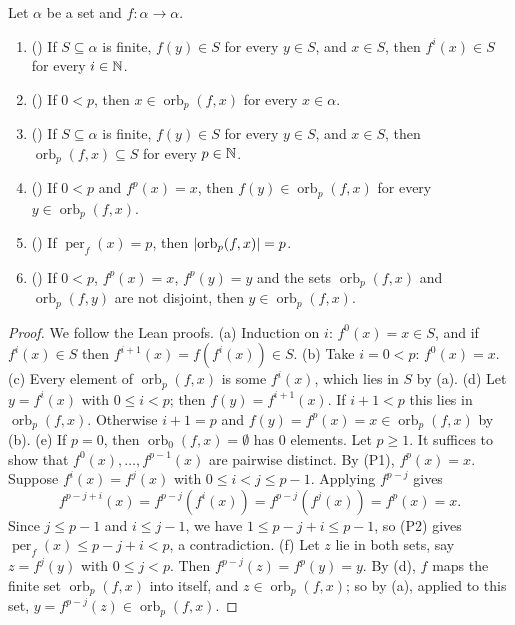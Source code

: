 \begin{lemma}\label{ll:lem:orbit}
Let $\alpha$ be a set and $f:\alpha\to\alpha$.
\begin{enumerate}[label=(\alph*)]
\item () If $S\subseteq\alpha$ is finite, $f(y)\in S$ for every $y\in S$, and $x\in S$, then
  $f^i(x)\in S$ for every $i\in\mathbb N$.
\item () If $0<p$, then $x\in\operatorname{orb}_p(f,x)$ for every $x\in\alpha$.
\item () If $S\subseteq\alpha$ is finite, $f(y)\in S$ for every $y\in S$, and $x\in S$, then
  $\operatorname{orb}_p(f,x)\subseteq S$ for every $p\in\mathbb N$.
\item () If $0<p$ and $f^p(x)=x$, then $f(y)\in\operatorname{orb}_p(f,x)$ for every
  $y\in\operatorname{orb}_p(f,x)$.
\item () If $\operatorname{per}_f(x)=p$, then
  $\lvert\operatorname{orb}_p(f,x)\rvert=p$.
\item () If $0<p$, $f^p(x)=x$, $f^p(y)=y$ and the sets $\operatorname{orb}_p(f,x)$
  and $\operatorname{orb}_p(f,y)$ are not disjoint, then $y\in\operatorname{orb}_p(f,x)$.
\end{enumerate}
\end{lemma}

\begin{proof}
We follow the Lean proofs.
(a) Induction on $i$: $f^0(x)=x\in S$, and if $f^i(x)\in S$ then $f^{i+1}(x)=f(f^i(x))\in S$.
(b) Take $i=0<p$: $f^0(x)=x$.
(c) Every element of $\operatorname{orb}_p(f,x)$ is some $f^i(x)$, which lies in $S$ by (a).
(d) Let $y=f^i(x)$ with $0\le i<p$; then $f(y)=f^{i+1}(x)$. If $i+1<p$ this lies in $\operatorname{orb}_p(f,x)$.
Otherwise $i+1=p$ and $f(y)=f^p(x)=x\in\operatorname{orb}_p(f,x)$ by (b).
(e) If $p=0$, then $\operatorname{orb}_0(f,x)=\emptyset$ has $0$ elements. Let $p\ge1$. It suffices to show that
$f^0(x),\dots,f^{p-1}(x)$ are pairwise distinct. By (P1), $f^p(x)=x$. Suppose $f^i(x)=f^j(x)$ with $0\le i<j\le p-1$.
Applying $f^{p-j}$ gives
\[f^{p-j+i}(x)=f^{p-j}(f^i(x))=f^{p-j}(f^j(x))=f^p(x)=x .\]
Since $j\le p-1$ and $i\le j-1$, we have $1\le p-j+i\le p-1$, so (P2) gives $\operatorname{per}_f(x)\le p-j+i<p$, a
contradiction.
(f) Let $z$ lie in both sets, say $z=f^j(y)$ with $0\le j<p$. Then $f^{p-j}(z)=f^{p}(y)=y$. By (d), $f$ maps the finite
set $\operatorname{orb}_p(f,x)$ into itself, and $z\in\operatorname{orb}_p(f,x)$; so by (a), applied to this set,
$y=f^{p-j}(z)\in\operatorname{orb}_p(f,x)$.
\end{proof}

